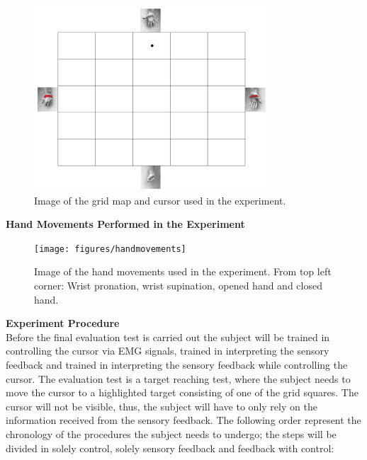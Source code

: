 \begin{figure}[H]                 
	\includegraphics[width=0.78\textwidth]{figures/gridmap}  
	\caption{Image of the grid map and cursor used in the experiment.}
	\label{fig:gridmap} 
\end{figure}


\textbf{{\Large Hand Movements Performed in the Experiment}} \\

\begin{figure}[H]                 
	\texttt{[image: figures/handmovements]}  
	\caption{Image of the hand movements used in the experiment. From top left corner: Wrist pronation, wrist supination, opened hand and closed hand.}
	\label{fig:handmovements} 
\end{figure}

\textbf{{\Large Experiment Procedure}} \\
\newline
Before the final evaluation test is carried out the subject will be trained in controlling the cursor via EMG signals, trained in interpreting the sensory feedback and trained in interpreting the sensory feedback while controlling the cursor. The evaluation test is a target reaching test, where the subject needs to move the cursor to a highlighted target consisting of one of the grid squares. The cursor will not be visible, thus, the subject will have to only rely on the information received from the sensory feedback. The following order represent the chronology of the procedures the subject needs to undergo; the steps will be divided in solely control, solely sensory feedback and feedback with control:



